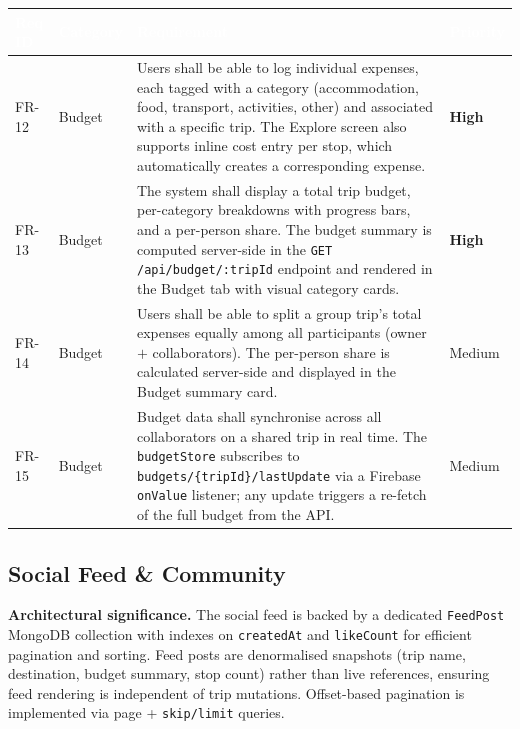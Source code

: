 \documentclass[12pt, a4paper]{article}
\newcommand{\reqid}[1]{\textsc{\small #1}}
\newcommand{\high}{\textbf{High}}
\newcommand{\medium}{Medium}
\newcommand{\thcell}[1]{\textcolor{white}{\textbf{\small #1}}}
\begin{document}
\vspace{0.4em}
\begin{longtable}{C{1.6cm} C{2.0cm} L{8.2cm} C{1.8cm}}
\toprule
{}
\thcell{Req ID} & \thcell{Category} & \thcell{Requirement} & \thcell{Priority} \\
\midrule
\endhead
\bottomrule
\endfoot

\reqid{FR-12} & Budget &
Users shall be able to log individual expenses, each tagged with a category (accommodation, food, transport, activities, other) and associated with a specific trip. The Explore screen also supports inline cost entry per stop, which automatically creates a corresponding expense. &
\high \\

\reqid{FR-13} & Budget &
The system shall display a total trip budget, per-category breakdowns with progress bars, and a per-person share. The budget summary is computed server-side in the \texttt{GET /api/budget/:tripId} endpoint and rendered in the Budget tab with visual category cards. &
\high \\

\reqid{FR-14} & Budget &
Users shall be able to split a group trip's total expenses equally among all participants (owner $+$ collaborators). The per-person share is calculated server-side and displayed in the Budget summary card. &
\medium \\

\reqid{FR-15} & Budget &
Budget data shall synchronise across all collaborators on a shared trip in real time. The \texttt{budgetStore} subscribes to \texttt{budgets/\{tripId\}/lastUpdate} via a Firebase \texttt{onValue} listener; any update triggers a re-fetch of the full budget from the API. &
\medium \\

\end{longtable}

\subsection{Social Feed \& Community}

\begin{tcolorbox}[notebox]
  \textbf{Architectural significance.} The social feed is backed by a dedicated \texttt{FeedPost} MongoDB collection with indexes on \texttt{createdAt} and \texttt{likeCount} for efficient pagination and sorting. Feed posts are denormalised snapshots (trip name, destination, budget summary, stop count) rather than live references, ensuring feed rendering is independent of trip mutations. Offset-based pagination is implemented via page + \texttt{skip/limit} queries.
\end{tcolorbox}
\end{document}
